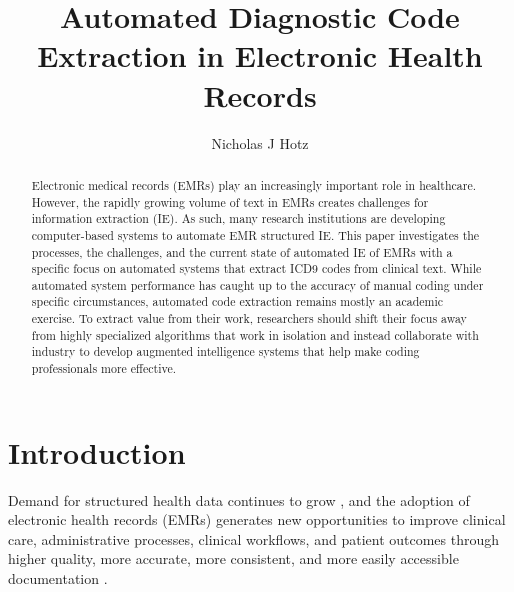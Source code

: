 \documentclass[sigconf]{acmart}
\begin{document}
\title{Automated Diagnostic Code Extraction in Electronic Health Records}

\author{Nicholas J Hotz}

\begin{abstract}
Electronic medical records (EMRs) play an increasingly important role in healthcare. However, the rapidly growing volume of text in EMRs creates challenges for information extraction (IE). As such, many research institutions are developing computer-based systems to automate EMR structured IE. This paper investigates the processes, the challenges, and the current state of automated IE of EMRs with a specific focus on automated systems that extract ICD9 codes from clinical text. While automated system performance has caught up to the accuracy of manual coding under specific circumstances, automated code extraction remains mostly an academic exercise. To extract value from their work, researchers should shift their focus away from highly specialized algorithms that work in isolation and instead collaborate with industry to develop augmented intelligence systems that help make coding professionals more effective.
\end{abstract}



\maketitle

\section{Introduction}
Demand for structured health data continues to grow \cite{stanfill2010systematic}, and the adoption of electronic health records (EMRs) generates new opportunities to improve clinical care, administrative processes, clinical workflows, and patient outcomes through higher quality, more accurate, more consistent, and more easily accessible documentation \cite{meystre2008extracting} \cite{pons2016natural}.
\end{document}
